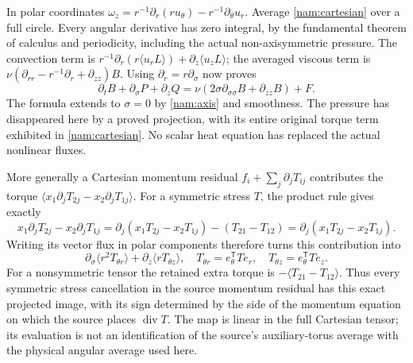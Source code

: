 In polar coordinates
$\omega_z=r^{-1}\partial_r(ru_\theta)
                  -r^{-1}\partial_\theta u_r$.
Average \eqref{nam:cartesian} over a full circle. Every angular
derivative has zero integral, by the fundamental theorem of calculus
and periodicity, including the actual non-axisymmetric pressure.
The convection term is
$r^{-1}\partial_r(r\langle u_rL\rangle)
 +\partial_z\langle u_zL\rangle$; the averaged viscous term is
$\nu(\partial_{rr}-r^{-1}\partial_r+\partial_{zz})B$.
Using $\partial_r=r\partial_\sigma$ now proves
\begin{equation}
 \partial_tB+\partial_\sigma P+\partial_zQ
   =\nu(2\sigma\partial_{\sigma\sigma}B+\partial_{zz}B)+F.
 \label{nam:pde}
\end{equation}
The formula extends to $\sigma=0$ by \eqref{nam:axis} and smoothness.
The pressure has disappeared here by a proved projection, with its
entire original torque term exhibited in \eqref{nam:cartesian}.
No scalar heat equation has replaced the actual nonlinear fluxes.

More generally a Cartesian momentum residual
$f_i+\sum_j\partial_jT_{ij}$ contributes the torque
$\langle x_1\partial_jT_{2j}-x_2\partial_jT_{1j}\rangle$.
For a symmetric stress $T$, the product rule gives exactly
\[
 x_1\partial_jT_{2j}-x_2\partial_jT_{1j}
  =\partial_j(x_1T_{2j}-x_2T_{1j})-(T_{21}-T_{12})
  =\partial_j(x_1T_{2j}-x_2T_{1j}).
\]
Writing its vector flux in polar components therefore turns this
contribution into
\begin{equation}
 \partial_\sigma\langle r^2 T_{\theta r}\rangle
       +\partial_z\langle r T_{\theta z}\rangle,
 \quad T_{\theta r}=e_\theta^{\mathsf T}Te_r,
 \quad T_{\theta z}=e_\theta^{\mathsf T}Te_z.
 \label{nam:stressmap}
\end{equation}
For a nonsymmetric tensor the retained extra torque is
$-\langle T_{21}-T_{12}\rangle$. Thus every symmetric stress
cancellation in the source momentum residual has this exact projected
image, with its sign determined by the side of the momentum equation
on which the source places $\operatorname{div}T$.
The map is linear in the full Cartesian tensor; its evaluation is not
an identification of the source's auxiliary-torus average with the
physical angular average used here.

